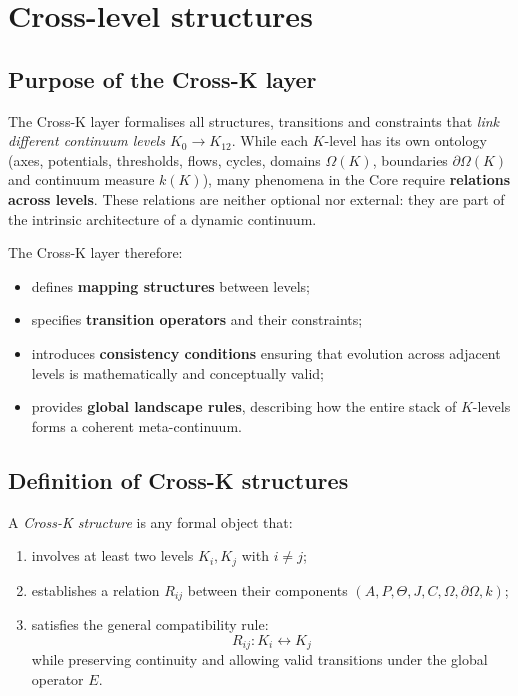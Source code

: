 
\section{Cross-level structures}
\label{sec:crossk_master}

\subsection{Purpose of the Cross-K layer}
The Cross-K layer formalises all structures, transitions and constraints
that \emph{link different continuum levels $K_0 \rightarrow K_{12}$}.  
While each $K$-level has its own ontology (axes, potentials, thresholds,
flows, cycles, domains $\Omega(K)$, boundaries $\partial\Omega(K)$ and
continuum measure $k(K)$), many phenomena in the Core require
\textbf{relations across levels}. These relations are neither optional
nor external: they are part of the intrinsic architecture of a dynamic
continuum.

The Cross-K layer therefore:
\begin{itemize}
  \item defines \textbf{mapping structures} between levels;
  \item specifies \textbf{transition operators} and their constraints;
  \item introduces \textbf{consistency conditions} ensuring that evolution
        across adjacent levels is mathematically and conceptually valid;
  \item provides \textbf{global landscape rules}, describing how the entire
        stack of $K$-levels forms a coherent meta-continuum.
\end{itemize}

\subsection{Definition of Cross-K structures}
A \emph{Cross-K structure} is any formal object that:
\begin{enumerate}
  \item involves at least two levels $K_i, K_j$ with $i \neq j$;
  \item establishes a relation $R_{ij}$ between their components
        $(A,P,\Theta,J,C,\Omega,\partial\Omega,k)$;
  \item satisfies the general compatibility rule:
        \[
        R_{ij} : K_i \leftrightarrow K_j
        \]
        while preserving continuity and allowing valid transitions under
        the global operator $E$.
\end{enumerate}

